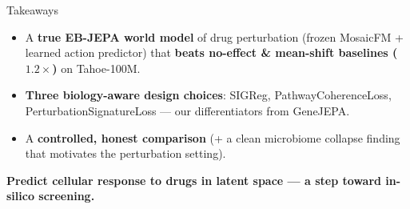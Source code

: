 \documentclass[aspectratio=169]{beamer}
\newcommand{\hl}[1]{\textcolor{secondary}{\textbf{#1}}}
\begin{document}
\begin{frame}{Takeaways}
\begin{block}{}
\begin{itemize}
  \item A \hl{true EB-JEPA world model} of drug perturbation (frozen MosaicFM + learned action predictor) that \hl{beats no-effect \& mean-shift baselines ($1.2\times$)} on Tahoe-100M.
  \item \hl{Three biology-aware design choices}: SIGReg, PathwayCoherenceLoss, PerturbationSignatureLoss --- our differentiators from GeneJEPA.
  \item A \hl{controlled, honest comparison} (+ a clean microbiome collapse finding that motivates the perturbation setting).
\end{itemize}
\end{block}
\centering\hl{Predict cellular response to drugs in latent space --- a step toward in-silico screening.}
\end{frame}
\end{document}
